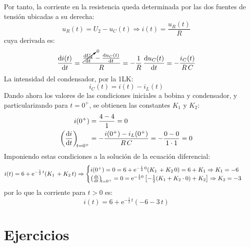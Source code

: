 \begin{example}
	    Por tanto, la corriente en la resistencia queda determinada por las dos fuentes de tensión ubicadas a su derecha:
	    \begin{equation*}
	        u_R(t)=U_2-u_C(t)\Rightarrow i(t)=\dfrac{u_R(t)}{R}
	    \end{equation*}
	    cuya derivada es: 
	    \begin{equation*}
	        \diff{i(t)}{t}=\dfrac{\cancelto{0}{\diff{U_2}{t}}-\diff{u_C(t)}{t}}{R}=-\dfrac{1}{R}\,\diff{u_C(t)}{t}=-\dfrac{i_C(t)}{R\,C}
	    \end{equation*}
	    La intensidad del condensador, por la 1LK:
	    \begin{equation*}
	        i_C(t)=i(t)-i_L(t)
	    \end{equation*}
	    Dando ahora los valores de las condiciones iniciales a bobina y condensador, y particularizando para $t=0^+$, se obtienen las constantes $K_1$ y $K_2$:
	    \begin{align*}
	        i(0^+)&=\dfrac{4-4}{1}=0\\
	        \diff{i}{t}[t = 0^+]&=-\dfrac{i(0^+)-i_L(0^+)}{R\,C}=-\dfrac{0-0}{1\cdot 1}=0
	    \end{align*}
	    Imponiendo estas condiciones a la solución de la ecuación diferencial:
	    \begin{equation*}
	        i(t)=6+\mathrm{e}^{-\frac{1}{2}\,t}(K_1\,+K_2\,t)\Rightarrow
	        \begin{cases}
	            i(0^+)=0=6+\mathrm{e}^{-\frac{1}{2}\,0}(K_1\,+K_2\,0)=6+K_1\Rightarrow K_1=-6\\
	            \diff{i}{t}[t = 0^+]=0=\mathrm{e}^{-\frac{1}{2}0}\left[-\frac{1}{2}(K_1+K_2\cdot 0)+K_2 \right]\Rightarrow K_2=-3
	        \end{cases}
	    \end{equation*}
	    por lo que la corriente para $t>0$ es:
	    \begin{equation*}
	        i(t)=6+\mathrm{e}^{-\frac{1}{2}\,t}(-6-3\,t)
	    \end{equation*}
	    
	\end{example}
	
	\section{Ejercicios}
	

